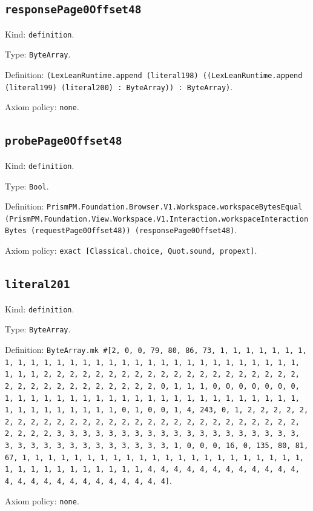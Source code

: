 \documentclass[11pt]{article}
\begin{document}
\subsection*{\texttt{responsePage0Offset48}}
\noindent Kind: \texttt{definition}.\par
\noindent Type: \texttt{ByteArray}.\par
\noindent Definition: \texttt{(LexLeanRuntime.append (literal198) ((LexLeanRuntime.append (literal199) (literal200) : ByteArray)) : ByteArray)}.\par
\noindent Axiom policy: \texttt{none}.\par
\subsection*{\texttt{probePage0Offset48}}
\noindent Kind: \texttt{definition}.\par
\noindent Type: \texttt{Bool}.\par
\noindent Definition: \texttt{PrismPM.Foundation.Browser.V1.Workspace.workspaceBytesEqual (PrismPM.Foundation.View.Workspace.V1.Interaction.workspaceInteractionBytes (requestPage0Offset48)) (responsePage0Offset48)}.\par
\noindent Axiom policy: \texttt{exact [Classical.choice, Quot.sound, propext]}.\par
\subsection*{\texttt{literal201}}
\noindent Kind: \texttt{definition}.\par
\noindent Type: \texttt{ByteArray}.\par
\noindent Definition: \texttt{ByteArray.mk \#[2, 0, 0, 79, 80, 86, 73, 1, 1, 1, 1, 1, 1, 1, 1, 1, 1, 1, 1, 1, 1, 1, 1, 1, 1, 1, 1, 1, 1, 1, 1, 1, 1, 1, 1, 1, 1, 1, 1, 1, 2, 2, 2, 2, 2, 2, 2, 2, 2, 2, 2, 2, 2, 2, 2, 2, 2, 2, 2, 2, 2, 2, 2, 2, 2, 2, 2, 2, 2, 2, 2, 2, 0, 1, 1, 1, 0, 0, 0, 0, 0, 0, 0, 1, 1, 1, 1, 1, 1, 1, 1, 1, 1, 1, 1, 1, 1, 1, 1, 1, 1, 1, 1, 1, 1, 1, 1, 1, 1, 1, 1, 1, 1, 1, 1, 0, 1, 0, 0, 1, 4, 243, 0, 1, 2, 2, 2, 2, 2, 2, 2, 2, 2, 2, 2, 2, 2, 2, 2, 2, 2, 2, 2, 2, 2, 2, 2, 2, 2, 2, 2, 2, 2, 2, 2, 2, 3, 3, 3, 3, 3, 3, 3, 3, 3, 3, 3, 3, 3, 3, 3, 3, 3, 3, 3, 3, 3, 3, 3, 3, 3, 3, 3, 3, 3, 3, 3, 3, 1, 0, 0, 0, 16, 0, 135, 80, 81, 67, 1, 1, 1, 1, 1, 1, 1, 1, 1, 1, 1, 1, 1, 1, 1, 1, 1, 1, 1, 1, 1, 1, 1, 1, 1, 1, 1, 1, 1, 1, 1, 1, 1, 4, 4, 4, 4, 4, 4, 4, 4, 4, 4, 4, 4, 4, 4, 4, 4, 4, 4, 4, 4, 4, 4, 4, 4, 4]}.\par
\noindent Axiom policy: \texttt{none}.\par
\end{document}
